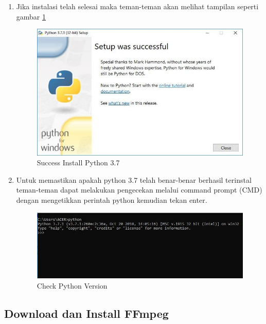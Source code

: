 \begin{enumerate}
\item Jika instalasi telah selesai maka teman-teman akan melihat tampilan seperti gambar \ref{python3}
\begin{figure}[H]
\centering
\includegraphics[scale=.4]{figures/python3}
\caption{Success Install Python 3.7}
\label{python3}
\end{figure}

\item Untuk memastikan apakah python 3.7 telah benar-benar berhasil terinstal teman-teman dapat melakukan pengecekan melalui command prompt (CMD) dengan mengetikkan perintah python kemudian tekan enter.
\begin{figure}[H]
\centering
\includegraphics[scale=.4]{figures/python4}
\caption{Check Python Version}
\label{python4}
\end{figure}

\end{enumerate}

\subsection{Download dan Install FFmpeg}

